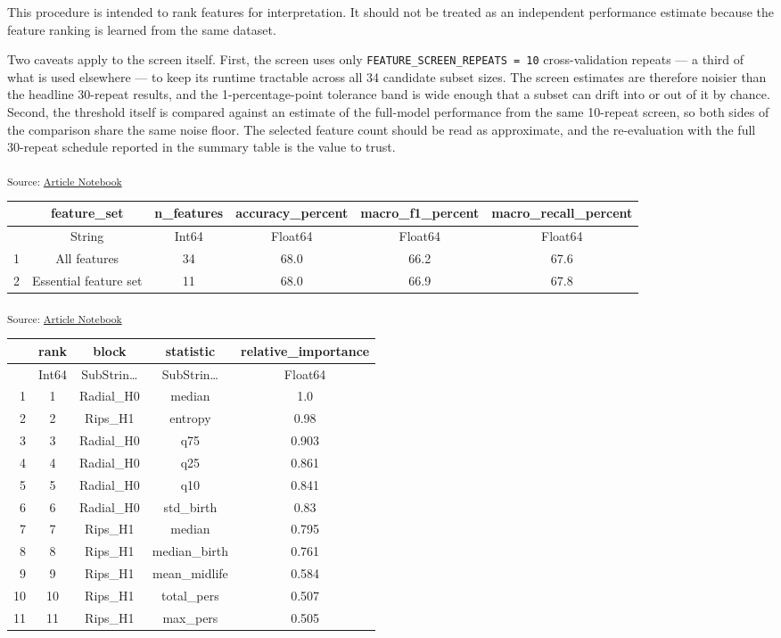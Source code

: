 \documentclass[
  a4paper,
  DIV=11,
  numbers=noendperiod]{scrartcl}
\begin{document}
This procedure is intended to rank features for interpretation. It
should not be treated as an independent performance estimate because the
feature ranking is learned from the same dataset.

Two caveats apply to the screen itself. First, the screen uses only
\texttt{FEATURE\_SCREEN\_REPEATS\ =\ 10} cross-validation repeats --- a
third of what is used elsewhere --- to keep its runtime tractable across
all 34 candidate subset sizes. The screen estimates are therefore
noisier than the headline 30-repeat results, and the 1-percentage-point
tolerance band is wide enough that a subset can drift into or out of it
by chance. Second, the threshold itself is compared against an estimate
of the full-model performance from the same 10-repeat screen, so both
sides of the comparison share the same noise floor. The selected feature
count should be read as approximate, and the re-evaluation with the full
30-repeat schedule reported in the summary table is the value to trust.

\textsubscript{Source:
\href{https://JuliaTDA.github.io/tda-fly/index.qmd.html}{Article
Notebook}}

\begin{tabular}{r|ccccc}
    & feature\_set & n\_features & accuracy\_percent & macro\_f1\_percent & macro\_recall\_percent\\
    \hline
    & String & Int64 & Float64 & Float64 & Float64\\
    \hline
    1 & All features & 34 & 68.0 & 66.2 & 67.6 \\
    2 & Essential feature set & 11 & 68.0 & 66.9 & 67.8 \\
\end{tabular}

\textsubscript{Source:
\href{https://JuliaTDA.github.io/tda-fly/index.qmd.html}{Article
Notebook}}

\begin{tabular}{r|cccc}
    & rank & block & statistic & relative\_importance\\
    \hline
    & Int64 & SubStrin… & SubStrin… & Float64\\
    \hline
    1 & 1 & Radial\_H0 & median & 1.0 \\
    2 & 2 & Rips\_H1 & entropy & 0.98 \\
    3 & 3 & Radial\_H0 & q75 & 0.903 \\
    4 & 4 & Radial\_H0 & q25 & 0.861 \\
    5 & 5 & Radial\_H0 & q10 & 0.841 \\
    6 & 6 & Radial\_H0 & std\_birth & 0.83 \\
    7 & 7 & Rips\_H1 & median & 0.795 \\
    8 & 8 & Rips\_H1 & median\_birth & 0.761 \\
    9 & 9 & Rips\_H1 & mean\_midlife & 0.584 \\
    10 & 10 & Rips\_H1 & total\_pers & 0.507 \\
    11 & 11 & Rips\_H1 & max\_pers & 0.505 \\
\end{tabular}
\end{document}
